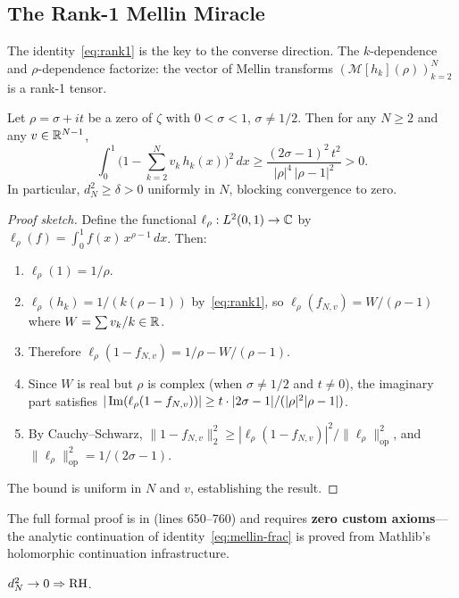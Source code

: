 \documentclass[11pt,a4paper]{article}
\begin{document}
\subsection{The Rank-1 Mellin Miracle}

The identity~\eqref{eq:rank1} is the key to the converse direction.
The $k$-dependence and $\rho$-dependence factorize: the vector of
Mellin transforms $(\mathcal{M}[h_k](\rho))_{k=2}^N$ is a rank-1 tensor.

\begin{theorem}
\label{thm:rank1}
Let $\rho = \sigma + it$ be a zero of $\zeta$ with $0 < \sigma < 1$,
$\sigma \neq 1/2$. Then for any $N \geq 2$ and any
$v \in \mathbb{R}^{N-1}$,
\[
  \int_0^1 \biggl(1 - \sum_{k=2}^N v_k\,h_k(x)\biggr)^2\,dx
  \geq \frac{(2\sigma - 1)^2\,t^2}{|\rho|^4\,|\rho-1|^2} > 0.
\]
In particular, $d_N^2 \geq \delta > 0$ uniformly in $N$, blocking
convergence to zero.
\end{theorem}

\begin{proof}[Proof sketch]
Define the functional $\ell_\rho : L^2(0,1) \to \mathbb{C}$ by
$\ell_\rho(f) = \int_0^1 f(x)\,x^{\rho-1}\,dx$. Then:
\begin{enumerate}
  \item $\ell_\rho(1) = 1/\rho$.
  \item $\ell_\rho(h_k) = 1/(k(\rho-1))$ by~\eqref{eq:rank1}, so
    $\ell_\rho(f_{N,v}) = W/(\rho-1)$ where $W = \sum v_k/k \in \mathbb{R}$.
  \item Therefore $\ell_\rho(1 - f_{N,v}) = 1/\rho - W/(\rho-1)$.
  \item Since $W$ is real but $\rho$ is complex (when $\sigma \neq 1/2$
    and $t \neq 0$), the imaginary part satisfies
    $|\operatorname{Im}(\ell_\rho(1 - f_{N,v}))| \geq t \cdot |2\sigma - 1| /
    (|\rho|^2 |\rho-1|)$.
  \item By Cauchy--Schwarz,
    $\|1 - f_{N,v}\|_2^2 \geq |\ell_\rho(1 - f_{N,v})|^2 /
    \|\ell_\rho\|_{\mathrm{op}}^2$,
    and $\|\ell_\rho\|_{\mathrm{op}}^2 = 1/(2\sigma - 1)$.
\end{enumerate}
The bound is uniform in $N$ and $v$, establishing the result.
\end{proof}

The full formal proof is in  (lines 650--760) and
requires \textbf{zero custom axioms}---the analytic continuation of
identity~\eqref{eq:mellin-frac} is proved from Mathlib's holomorphic
continuation infrastructure.

\begin{corollary}
\label{cor:converse}
$d_N^2 \to 0 \Rightarrow \mathrm{RH}$.
\end{corollary}
\end{document}
